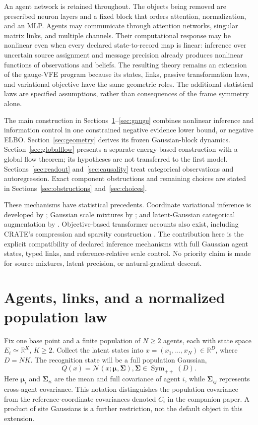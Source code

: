\documentclass[11pt]{article}
\newcommand{\R}{\mathbb R}
\newcommand{\SPD}{\operatorname{Sym}_{++}}
\newcommand{\m}{\boldsymbol{\mu}}
\newcommand{\Sig}{\boldsymbol{\Sigma}}
\begin{document}
An agent network is retained throughout. The objects being removed are prescribed neuron layers and a fixed block that orders attention, normalization, and an MLP. Agents may communicate through attention networks, singular matrix links, and multiple channels. Their computational response may be nonlinear even when every declared state-to-record map is linear: inference over uncertain source assignment and message precision already produces nonlinear functions of observations and beliefs. The resulting theory remains an extension of the gauge-VFE program because its states, links, passive transformation laws, and variational objective have the same geometric roles. The additional statistical laws are specified assumptions, rather than consequences of the frame symmetry alone.

The main construction in Sections~\ref{sec:population}--\ref{sec:gauge} combines nonlinear inference and information control in one constrained negative evidence lower bound, or negative ELBO. Section~\ref{sec:geometry} derives its frozen Gaussian-block dynamics. Section~\ref{sec:globalflow} presents a separate energy-based construction with a global flow theorem; its hypotheses are not transferred to the first model. Sections~\ref{sec:readout} and~\ref{sec:causality} treat categorical observations and autoregression. Exact component obstructions and remaining choices are stated in Sections~\ref{sec:obstructions} and~\ref{sec:choices}.

These mechanisms have statistical precedents. Coordinate variational inference is developed by \citet{Blei2017}; Gaussian scale mixtures by \citet{AndrewsMallows1974}; and latent-Gaussian categorical augmentation by \citet{AlbertChib1993}. Objective-based transformer accounts also exist, including CRATE's compression and sparsity construction \citep{Yu2024CRATE}. The contribution here is the explicit compatibility of declared inference mechanisms with full Gaussian agent states, typed links, and reference-relative scale control. No priority claim is made for source mixtures, latent precision, or natural-gradient descent.

\section{Agents, links, and a normalized population law}
\label{sec:population}

Fix one base point and a finite population of $N\ge2$ agents, each with state space $E_i\simeq\R^K$, $K\ge2$. Collect the latent states into $x=(x_1,\ldots,x_N)\in\R^D$, where $D=NK$. The recognition state will be a full population Gaussian,
\begin{equation}
Q(x)=\mathcal N(x;\m,\Sig), \Sig\in\SPD(D).
\label{eq:jointgaussian}
\end{equation}
Here $\m_i$ and $\Sig_{ii}$ are the mean and full covariance of agent $i$, while $\Sig_{ij}$ represents cross-agent covariance. This notation distinguishes the population covariance from the reference-coordinate covariances denoted $C_i$ in the companion paper. A product of site Gaussians is a further restriction, not the default object in this extension.
\end{document}
